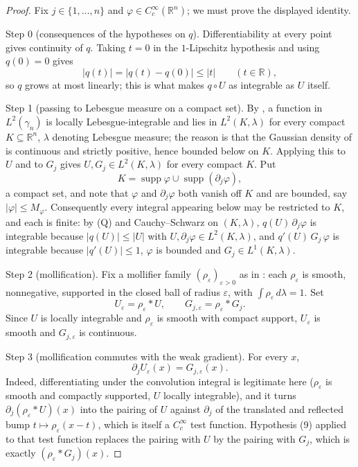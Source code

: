 \begin{proof}
Fix $j \in \{1,\ldots,n\}$ and $\varphi \in C_c^\infty(\mathbb{R}^n)$; we must
prove the displayed identity.

Step 0 (consequences of the hypotheses on $q$).  Differentiability at every
point gives continuity of $q$.  Taking $t = 0$ in the $1$-Lipschitz hypothesis
and using $q(0) = 0$ gives
\[
  |q(t)| = |q(t) - q(0)| \leq |t| \qquad (t \in \mathbb{R}), \tag{Q}
\]
so $q$ grows at most linearly; this is what makes $q \circ U$ as integrable as
$U$ itself.

Step 1 (passing to Lebesgue measure on a compact set).  By
, a function in $L^2(\gamma_n)$ is locally
Lebesgue-integrable and lies in $L^2(K,\lambda)$ for every compact
$K \subseteq \mathbb{R}^n$, $\lambda$ denoting Lebesgue measure; the reason is
that the Gaussian density of  is continuous and strictly
positive, hence bounded below on $K$.  Applying this to $U$ and to $G_j$ gives
$U, G_j \in L^2(K,\lambda)$ for every compact $K$.  Put
\[
  K = \operatorname{supp}\varphi \cup \operatorname{supp}(\partial_j\varphi),
\]
a compact set, and note that $\varphi$ and $\partial_j\varphi$ both vanish off
$K$ and are bounded, say $|\varphi| \leq M_\varphi$.  Consequently every integral
appearing below may be restricted to $K$, and each is finite: by (Q) and
Cauchy--Schwarz on $(K,\lambda)$, $q(U)\,\partial_j\varphi$ is integrable
because $|q(U)| \leq |U|$ with $U, \partial_j\varphi \in L^2(K,\lambda)$, and
$q'(U)\,G_j\,\varphi$ is integrable because $|q'(U)| \leq 1$, $\varphi$ is
bounded and $G_j \in L^1(K,\lambda)$.

Step 2 (mollification).  Fix a mollifier family $(\rho_\varepsilon)_{\varepsilon>0}$
as in : each $\rho_\varepsilon$ is smooth, nonnegative,
supported in the closed ball of radius $\varepsilon$, with
$\int \rho_\varepsilon \, d\lambda = 1$.  Set
\[
  U_\varepsilon = \rho_\varepsilon * U, \qquad
  G_{j,\varepsilon} = \rho_\varepsilon * G_j .
\]
Since $U$ is locally integrable and $\rho_\varepsilon$ is smooth with compact
support, $U_\varepsilon$ is smooth and $G_{j,\varepsilon}$ is continuous.

Step 3 (mollification commutes with the weak gradient).  For every $x$,
\[
  \partial_j U_\varepsilon(x) = G_{j,\varepsilon}(x) .
\]
Indeed, differentiating under the convolution integral is legitimate here
($\rho_\varepsilon$ is smooth and compactly supported, $U$ locally integrable),
and it turns $\partial_j(\rho_\varepsilon * U)(x)$ into the pairing of $U$
against $\partial_j$ of the translated and reflected bump
$t \mapsto \rho_\varepsilon(x-t)$, which is itself a $C_c^\infty$ test function.
Hypothesis (9) applied to that test function replaces the pairing with $U$ by the
pairing with $G_j$, which is exactly $(\rho_\varepsilon * G_j)(x)$.


\end{proof}
